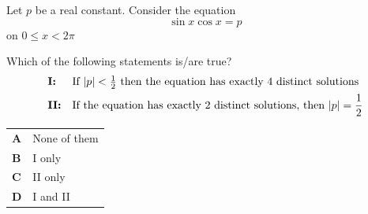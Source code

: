 \documentclass[11pt,a4paper]{article}
\begin{document}
\clearpage
\thispagestyle{djspaper}
\vspace*{8pt}
\begin{enumerate}[label=\textbf{\arabic*.},leftmargin=*,itemsep=0pt,start=5]
\questionitem[Trigonometry]
Let $p$ be a real constant. Consider the equation \[\sin x \cos x = p\] on $0 \le x < 2\pi$

Which of the following statements is/are true? \[ \begin{array}{@{}l l@{}}
\textbf{I:} & \text{If } |p|<\tfrac12 \text{ then the equation has exactly 4 distinct solutions} \\[5pt]
\textbf{II:} & \text{If the equation has exactly 2 distinct solutions, then } |p|=\dfrac12
\end{array} \]

\par\vspace*{12pt}
\begin{tabularx}{\linewidth}{@{}>{\bfseries}l Y@{}}
A &
None of them
\\[0.8em]
B &
I only
\\[0.8em]
C &
II only
\\[0.8em]
D &
I and II
\\
\end{tabularx}
\end{enumerate}
\clearpage
\thispagestyle{djspaper}
\vspace*{8pt}
\end{document}
